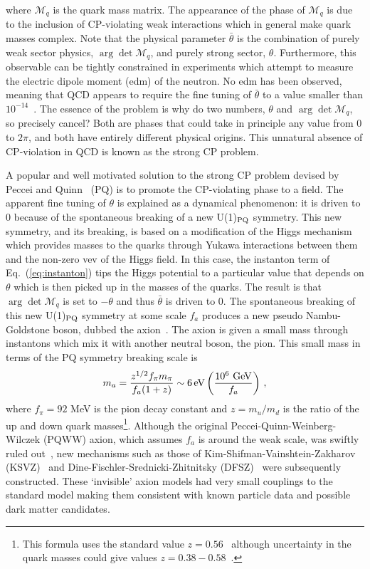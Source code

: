 where $\mathcal{M}_q$ is the quark mass matrix. The appearance of the phase of $\mathcal{M}_q$ is due to the inclusion of CP-violating weak interactions which in general make quark masses complex. Note that the physical parameter $\bar{\theta}$ is the combination of purely weak sector physics, $\arg \det \mathcal{M}_q$, and purely strong sector, $\theta$. Furthermore, this observable can be tightly constrained in experiments which attempt to measure the electric dipole moment (edm) of the neutron. No edm has been observed, meaning that QCD appears to require the fine tuning of $\bar{\theta}$ to a value smaller than $10^{-14}$~\cite{Baker:2006ts}. The essence of the problem is why do two numbers, $\theta$ and $\arg \det \mathcal{M}_q$, so precisely cancel? Both are phases that could take in principle any value from 0 to $2 \pi$, and both have entirely different physical origins. This unnatural absence of CP-violation in QCD is known as the strong CP problem.

A popular and well motivated solution to the strong CP problem devised by Peccei and Quinn~\cite{Peccei:1977hh, Kim:2008hd} (PQ) is to promote the CP-violating phase to a field. The apparent fine tuning of $\theta$ is explained as a dynamical phenomenon: it is driven to 0 because of the spontaneous breaking of a new U(1)$_{\rm PQ}$ symmetry. This new symmetry, and its breaking, is based on a modification of the Higgs mechanism which provides masses to the quarks through Yukawa interactions between them and the non-zero vev of the Higgs field. In this case, the instanton term of Eq.~(\ref{eq:instanton}) tips the Higgs potential to a particular value that depends on $\theta$ which is then picked up in the masses of the quarks. The result is that $\arg \det \mathcal{M}_q$ is set to $-\theta$ and thus $\bar{\theta}$ is driven to 0. The spontaneous breaking of this new U(1)$_{\rm PQ}$ symmetry at some scale $f_a$ produces a new pseudo Nambu-Goldstone boson, dubbed the axion~\cite{Wilczek:1977pj,Weinberg:1977ma}. The axion is given a small mass through instantons which mix it with another neutral boson, the pion. This small mass in terms of the PQ symmetry breaking scale is~\cite{Cheng:1987gp}
\begin{equation}
 m_a = \frac{z^{1/2} f_\pi m_\pi}{f_a(1+z)} \sim 6\,{\rm eV}\left(\frac{10^6\,\,{\rm GeV}}{f_a}\right) \, ,
\end{equation}
where $f_\pi = 92$ MeV is the pion decay constant and $z = m_u/m_d$ is the ratio of the up and down quark masses\footnote{This formula uses the standard value $z=0.56$~\cite{Leutwyler:1996qg} although uncertainty in the quark masses could give values $z = 0.38 - 0.58$~\cite{Agashe:2014kda}.}. Although the original Peccei-Quinn-Weinberg-Wilczek (PQWW) axion, which assumes $f_a$ is around the weak scale, was swiftly ruled out~\cite{Antreasyan:1990cf}, new mechanisms such as those of Kim-Shifman-Vainshtein-Zakharov (KSVZ)~\cite{Kim:1979if,Shifman:1979nz} and Dine-Fischler-Srednicki-Zhitnitsky (DFSZ)~\cite{Dine:1981rt,Zhitnitsky:1980tq} were subsequently constructed. These `invisible' axion models had very small couplings to the standard model making them consistent with known particle data and possible dark matter candidates.

